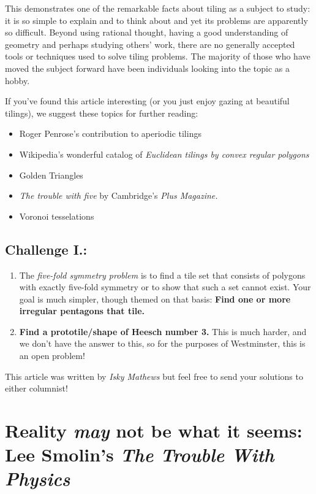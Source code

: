 \documentclass[1opt,a4paper]{article}
\begin{document}
\begin{multicols}{2}
This demonstrates one of the remarkable facts about tiling as a subject
to study: it is so simple to explain and to think about and yet its
problems are apparently so difficult. Beyond using rational thought,
having a good understanding of geometry and perhaps studying others'
work, there are no generally accepted tools or techniques used to solve
tiling problems. The majority of those who have moved the subject
forward have been individuals looking into the topic as a hobby.

If you've found this article interesting (or you just enjoy gazing at
beautiful tilings), we suggest these topics for further reading:

\begin{itemize}
	\item
	Roger Penrose's contribution to aperiodic tilings
	\item
	Wikipedia's wonderful catalog of \emph{Euclidean tilings by convex
		regular polygons}
	\item
	Golden Triangles
	\item
	\emph{The trouble with five }by Cambridge's \emph{Plus Magazine.}
	\item
	Voronoi tesselations
\end{itemize}

\subsection{Challenge I.:}\label{challenge-i.}

\begin{enumerate}
	\item The \emph{five-fold symmetry problem }is to find a tile set
	that consists of polygons with exactly five-fold symmetry or to show
	that such a set cannot exist. Your goal is much simpler, though themed
	on that basis: \textbf{Find one or more irregular pentagons that tile.}
	\item \textbf{Find a prototile/shape of Heesch number 3.} This is much
	harder, and we don't have the answer to this, so for the purposes of
	Westminster, this is an open problem!
\end{enumerate}



This article was written by \emph{Isky Mathews} but feel free to send
your solutions to either columnist!
\end{multicols}

\section{Reality \emph{may} not be what it seems: Lee Smolin's \emph{The Trouble With
		Physics}}
\end{document}
